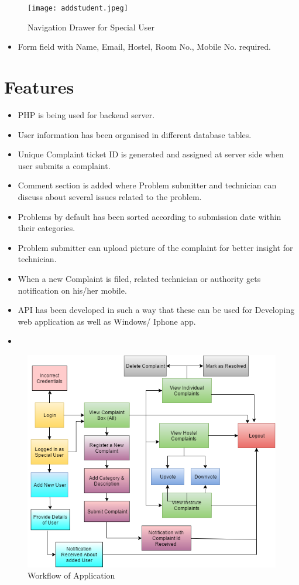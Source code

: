 \documentclass[12pt]{article}
\begin{document}
\begin{figure}[!ht]
	\centering
	\texttt{[image: addstudent.jpeg]}
	\caption{Navigation Drawer for Special User}
\end{figure}
\begin{itemize}
    \item Form field with Name, Email, Hostel, Room No., Mobile No. required.
\end{itemize}


\section{Features}

\begin{itemize}
\item PHP is being used for backend server.
\item User information has been organised in different database tables.
\item Unique Complaint ticket ID is generated and assigned at server side when user submits a complaint.
\item Comment section is added where Problem submitter and technician can discuss about several issues related to the problem.
\item Problems by default has been sorted according to submission date within their categories.
\item Problem submitter can upload picture of the complaint for better insight for technician.
\item When a new Complaint is filed, related technician or authority gets notification on his/her mobile.
\item API has been developed in such a way that these can be used for Developing web application as well as Windows/ Iphone app.
\item 
\end{itemize}


\begin{figure}[!ht]
	\centering
	\includegraphics[scale=0.7]{workflow.png}
	\caption{Workflow of Application}
\end{figure}
\end{document}
